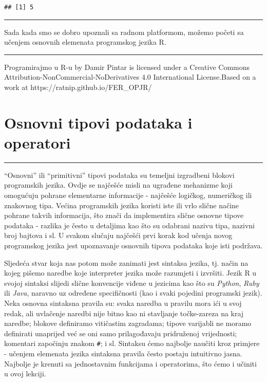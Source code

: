 \documentclass[]{book}
\theoremstyle{definition}
\theoremstyle{definition}
\theoremstyle{definition}
\theoremstyle{remark}
\begin{document}
\begin{verbatim}
## [1] 5
\end{verbatim}

\begin{center}\rule{0.5\linewidth}{\linethickness}\end{center}

Sada kada smo se dobro upoznali sa radnom platformom, možemo početi sa
učenjem osnovnih elemenata programskog jezika R.

\begin{center}\rule{0.5\linewidth}{\linethickness}\end{center}

{Programirajmo u R-u} by Damir Pintar is licensed under a Creative
Commons Attribution-NonCommercial-NoDerivatives 4.0 International
License.Based on a work at https://ratnip.github.io/FER\_OPJR/

\chapter{Osnovni tipovi podataka i operatori}\label{tipovi}

\begin{center}\rule{0.5\linewidth}{\linethickness}\end{center}

``Osnovni'' ili ``primitivni'' tipovi podataka su temeljni izgradbeni
blokovi programskih jezika. Ovdje se najčešće misli na ugrađene
mehanizme koji omogućuju pohrane elementarne informacije - najčešće
logičkog, numeričkog ili znakovnog tipa. Većina programskih jezika
koristi iste ili vrlo slične načine pohrane takvih informacija, što
znači da implementira slične osnovne tipove podataka - razlika je često
u detaljima kao što su odabrani nazivu tipa, nazivni broj bajtova i sl.
U svakom slučaju najčešći prvi korak kod učenja novog programskog jezika
jest upoznavanje osnovnih tipova podataka koje isti podržava.

Sljedeća stvar koja nas potom može zanimati jest sintaksa jezika, tj.
način na kojeg pišemo naredbe koje interpreter jezika može razumjeti i
izvršiti. Jezik R u svojoj sintaksi slijedi slične konvencije viđene u
jezicima kao što su \emph{Python}, \emph{Ruby} ili \emph{Java}, naravno
uz određene specifičnosti (kao i svaki pojedini programski jezik). Neka
osnovna sintaksna pravila su: svaka naredba u pravilu mora ići u svoj
redak, ali uvlačenje naredbi nije bitno kao ni stavljanje točke-zareza
na kraj naredbe; blokove definiramo vitičastim zagradama; tipove
varijabli ne moramo definirati unaprijed već se oni samo prilagođavaju
pridruženoj vrijednosti; komentari započinju znakom \texttt{\#}; i sl.
Sintaksu ćemo najbolje naučiti kroz primjere - učenjem elemenata jezika
sintaksna pravila često postaju intuitivno jasna. Najbolje je krenuti sa
jednostavnim funkcijama i operatorima, što ćemo i učiniti u ovoj
lekciji.
\end{document}
